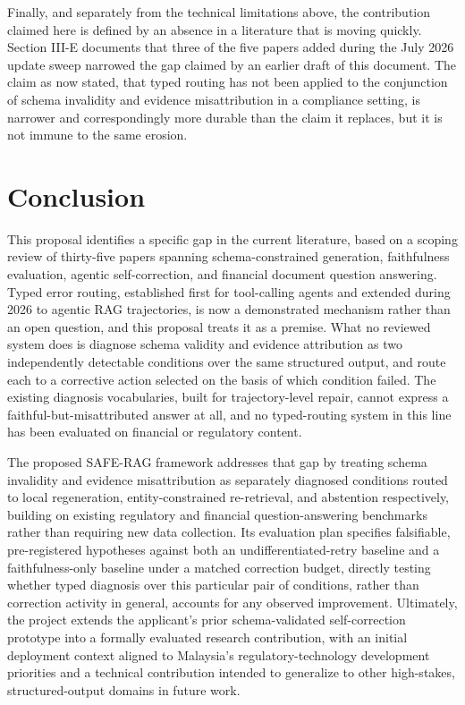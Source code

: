 \documentclass[10pt,twocolumn,letterpaper]{article}
\begin{document}
Finally, and separately from the technical limitations above, the contribution claimed here is defined by an absence in a literature that is moving quickly. Section III-E documents that three of the five papers added during the July 2026 update sweep narrowed the gap claimed by an earlier draft of this document. The claim as now stated, that typed routing has not been applied to the conjunction of schema invalidity and evidence misattribution in a compliance setting, is narrower and correspondingly more durable than the claim it replaces, but it is not immune to the same erosion.

\section{Conclusion}

This proposal identifies a specific gap in the current literature, based on a scoping review of thirty-five papers spanning schema-constrained generation, faithfulness evaluation, agentic self-correction, and financial document question answering. Typed error routing, established first for tool-calling agents and extended during 2026 to agentic RAG trajectories, is now a demonstrated mechanism rather than an open question, and this proposal treats it as a premise. What no reviewed system does is diagnose schema validity and evidence attribution as two independently detectable conditions over the same structured output, and route each to a corrective action selected on the basis of which condition failed. The existing diagnosis vocabularies, built for trajectory-level repair, cannot express a faithful-but-misattributed answer at all, and no typed-routing system in this line has been evaluated on financial or regulatory content.

The proposed SAFE-RAG framework addresses that gap by treating schema invalidity and evidence misattribution as separately diagnosed conditions routed to local regeneration, entity-constrained re-retrieval, and abstention respectively, building on existing regulatory and financial question-answering benchmarks rather than requiring new data collection. Its evaluation plan specifies falsifiable, pre-registered hypotheses against both an undifferentiated-retry baseline and a faithfulness-only baseline under a matched correction budget, directly testing whether typed diagnosis over this particular pair of conditions, rather than correction activity in general, accounts for any observed improvement. Ultimately, the project extends the applicant's prior schema-validated self-correction prototype into a formally evaluated research contribution, with an initial deployment context aligned to Malaysia's regulatory-technology development priorities and a technical contribution intended to generalize to other high-stakes, structured-output domains in future work.
\end{document}
